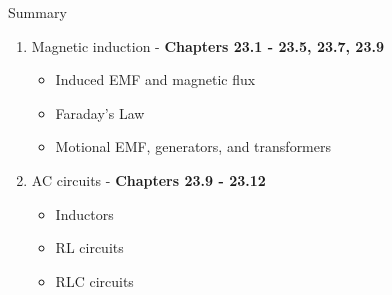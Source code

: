 \documentclass{beamer}
\begin{document}
\begin{frame}{Summary}
\begin{enumerate}
\item Magnetic induction - \textbf{Chapters 23.1 - 23.5, 23.7, 23.9}
\begin{itemize}
\item Induced EMF and magnetic flux
\item Faraday's Law
\item Motional EMF, generators, and transformers
\end{itemize}
\item AC circuits - \textbf{Chapters 23.9 - 23.12}
\begin{itemize}
\item Inductors
\item RL circuits
\item RLC circuits
\end{itemize}
\end{enumerate}
\end{frame}
\end{document}
